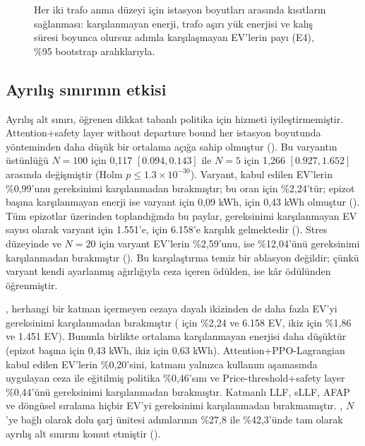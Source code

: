 \begin{figure}[t]
\centering
{}
\caption{Her iki trafo anma düzeyi için istasyon boyutları arasında kısıtların sağlanması: karşılanmayan enerji, trafo aşırı yük enerjisi ve kalış süresi boyunca olursuz adımla karşılaşmayan EV'lerin payı (E4), \%95 bootstrap aralıklarıyla.}
\label{fig:constraints}
\end{figure}

\subsection{Ayrılış sınırının etkisi}\label{sec:res-bound}

Ayrılış alt sınırı, öğrenen dikkat tabanlı politika için hizmeti iyileştirmemiştir.
Attention+safety layer without departure bound her istasyon boyutunda \method{} yönteminden daha düşük bir ortalama açığa sahip olmuştur ().
Bu varyantın üstünlüğü $N=100$ için 0,117 $[0.094,0.143]$ ile $N=5$ için 1,266 $[0.927,1.652]$ arasında değişmiştir (Holm $p\le1.3\times10^{-30}$).
Varyant, kabul edilen EV'lerin \%0,99'unu gereksinimi karşılanmadan bırakmıştır; bu oran \method{} için \%2,24'tür; epizot başına karşılanmayan enerji ise varyant için 0,09 kWh, \method{} için 0,43 kWh olmuştur ().
Tüm epizotlar üzerinden toplandığında bu paylar, gereksinimi karşılanmayan EV sayısı olarak varyant için 1.551'e, \method{} için 6.158'e karşılık gelmektedir ().
Stres düzeyinde ve $N=20$ için varyant EV'lerin \%2,59'unu, \method{} ise \%12,04'ünü gereksinimi karşılanmadan bırakmıştır ().
Bu karşılaştırma temiz bir ablasyon değildir; çünkü varyant kendi ayarlanmış ağırlığıyla ceza içeren ödülden, \method{} ise kâr ödülünden öğrenmiştir.

\method{}, herhangi bir katman içermeyen cezaya dayalı ikizinden de daha fazla EV'yi gereksinimi karşılanmadan bırakmıştır (\method{} için \%2,24 ve 6.158 EV, ikiz için \%1,86 ve 1.451 EV).
Bununla birlikte ortalama karşılanmayan enerjisi daha düşüktür (epizot başına \method{} için 0,43 kWh, ikiz için 0,63 kWh).
Attention+PPO-Lagrangian kabul edilen EV'lerin \%0,20'sini, katmanı yalnızca kullanım aşamasında uygulayan ceza ile eğitilmiş politika \%0,46'sını ve Price-threshold+safety layer \%0,44'ünü gereksinimi karşılanmadan bırakmıştır.
Katmanlı LLF, sLLF, AFAP ve döngüsel sıralama hiçbir EV'yi gereksinimi karşılanmadan bırakmamıştır.
\method{}, $N$'ye bağlı olarak dolu şarj ünitesi adımlarının \%27,8 ile \%42,3'ünde tam olarak ayrılış alt sınırını komut etmiştir ().

